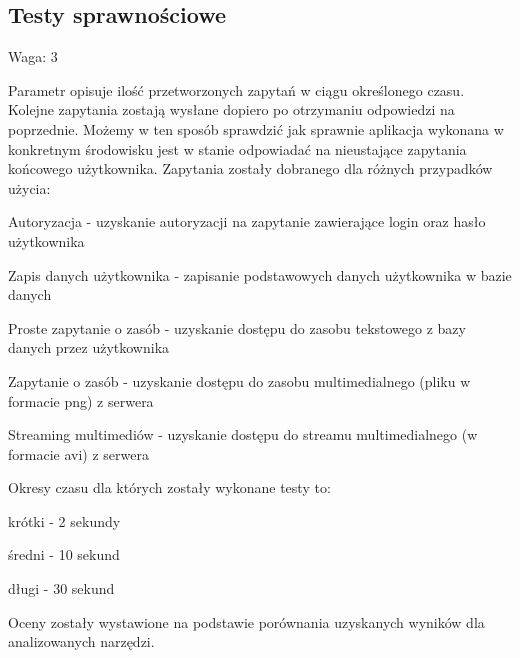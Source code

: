 \documentclass[12pt]{report}
\begin{document}
    \subsection{Testy sprawnościowe}
      \begin{description}
        \item Waga: 3
      \end{description}
      Parametr opisuje ilość przetworzonych zapytań w ciągu określonego czasu.
      Kolejne zapytania zostają wysłane dopiero po otrzymaniu odpowiedzi na poprzednie.
      Możemy w ten sposób sprawdzić jak sprawnie aplikacja wykonana w konkretnym środowisku jest w stanie odpowiadać na nieustające zapytania końcowego użytkownika.
      Zapytania zostały dobranego dla różnych przypadków użycia:
      \begin{description}
        \item Autoryzacja - uzyskanie autoryzacji na zapytanie zawierające login oraz hasło użytkownika
        \item Zapis danych użytkownika - zapisanie podstawowych danych użytkownika w bazie danych
        \item Proste zapytanie o zasób - uzyskanie dostępu do zasobu tekstowego z bazy danych przez użytkownika
        \item Zapytanie o zasób - uzyskanie dostępu do zasobu multimedialnego (pliku w formacie png) z serwera
        \item Streaming multimediów - uzyskanie dostępu do streamu multimedialnego (w formacie avi) z serwera
      \end{description}
      Okresy czasu dla których zostały wykonane testy to:
      \begin{description}
        \item krótki - 2 sekundy
        \item średni - 10 sekund
        \item długi - 30 sekund
      \end{description}
      Oceny zostały wystawione na podstawie porównania uzyskanych wyników dla analizowanych narzędzi.
      
\end{document}
